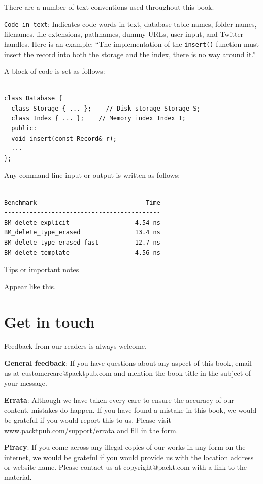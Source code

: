 There are a number of text conventions used throughout this book.

\texttt{Code\ in\ text}: Indicates code words in text, database table names, folder names, filenames, file extensions, pathnames, dummy URLs, user input, and Twitter handles. Here is an example: ``The implementation of the \texttt{insert()} function must insert the record into both the storage and the index, there is no way around it.''

A block of code is set as follows:

\begin{verbatim}

class Database {
  class Storage { ... };    // Disk storage Storage S;
  class Index { ... };    // Memory index Index I;
  public:
  void insert(const Record& r);
  ...
};
\end{verbatim}

Any command-line input or output is written as follows:

\begin{verbatim}

Benchmark                              Time
-------------------------------------------
BM_delete_explicit                  4.54 ns
BM_delete_type_erased               13.4 ns
BM_delete_type_erased_fast          12.7 ns
BM_delete_template                  4.56 ns
\end{verbatim}

Tips or important notes

Appear like this.

\section{Get in touch}

Feedback from our readers is always welcome.

\textbf{General feedback}: If you have questions about any aspect of this book, email us at customercare@packtpub.com and mention the book title in the subject of your message.

\textbf{Errata}: Although we have taken every care to ensure the accuracy of our content, mistakes do happen. If you have found a mistake in this book, we would be grateful if you would report this to us. Please visit www.packtpub.com/support/errata and fill in the form.

\textbf{Piracy}: If you come across any illegal copies of our works in any form on the internet, we would be grateful if you would provide us with the location address or website name. Please contact us at copyright@packt.com with a link to the material.

